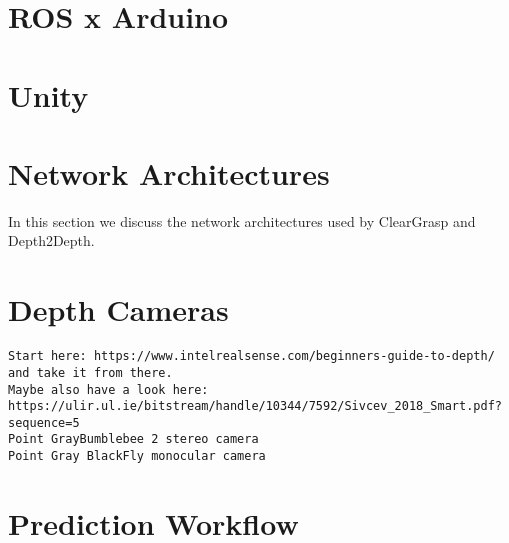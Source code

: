 \section{ROS x Arduino}



\section{Unity}



\section{Network Architectures}

In this section we discuss the network architectures used by ClearGrasp and Depth2Depth.



\section{Depth Cameras}

\begin{verbatim}
Start here: https://www.intelrealsense.com/beginners-guide-to-depth/
and take it from there.
Maybe also have a look here:
https://ulir.ul.ie/bitstream/handle/10344/7592/Sivcev_2018_Smart.pdf?sequence=5
Point GrayBumblebee 2 stereo camera
Point Gray BlackFly monocular camera
\end{verbatim}


\section{Prediction Workflow}

